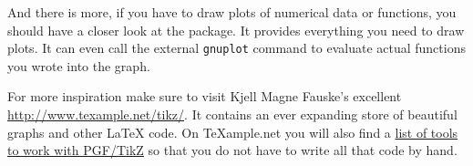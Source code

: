 And there is more, if you have to draw plots of numerical data or
functions, you should have a closer look at the  
package. It provides everything you need to draw plots. It can even
call the external \texttt{gnuplot} command to evaluate actual
functions you wrote into the graph.

For more inspiration make sure to visit Kjell Magne Fauske's excellent
\url{http://www.texample.net/tikz/}. It contains an ever expanding store of
beautiful graphs and other \LaTeX{} code. On \TeX{}ample.net you will also
find a
\href{http://www.texample.net/tikz/resources/#tools-that-generate-pgftikz-code}{list
  of tools to work with PGF/TikZ} so that you do not have to write all that
code by hand.

